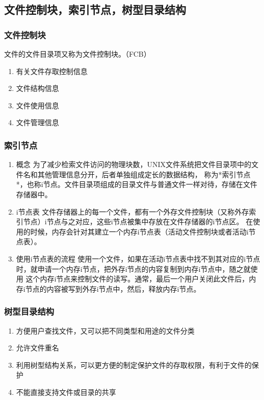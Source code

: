 \documentclass[11pt]{article}
\begin{document}
\subsection{文件控制块，索引节点，树型目录结构}
\label{sec-4-3}
\subsubsection{文件控制块}
\label{sec-4-3-1}
文件的文件目录项又称为文件控制块。（FCB）
\begin{enumerate}
\item 有关文件存取控制信息
\label{sec-4-3-1-1}
\item 文件结构信息
\label{sec-4-3-1-2}
\item 文件使用信息
\label{sec-4-3-1-3}
\item 文件管理信息
\label{sec-4-3-1-4}
\end{enumerate}
\subsubsection{索引节点}
\label{sec-4-3-2}
\begin{enumerate}
\item 概念
\label{sec-4-3-2-1}
为了减少检索文件访问的物理块数，UNIX文件系统把文件目录项中的文件名和其他管理信息分开，后者单独组成定长的数据结构， 
称为*索引节点*，也称i节点。文件目录项组成的目录文件与普通文件一样对待，存储在文件存储器中。 
\item i节点表
\label{sec-4-3-2-2}
文件存储器上的每一个文件，都有一个外存文件控制块（又称外存索引节点）i节点与之对应，这些i节点被集中存放在文件存储器的i节点区。
在使用的时候，内存会针对其建立一个内存i节点表（活动文件控制块或者活动i节点表）。
\item 使用i节点表的流程
\label{sec-4-3-2-3}
使用一个文件，如果在活动i节点表中找不到其对应的i节点时，就申请一个内存i节点，把外存i节点的内容复制到内存i节点中，随之就使用
这个内存i节点来控制文件的读写。通常，最后一个用户关闭此文件后，内存i节点的内容被写到外存i节点中，然后，释放内存i节点。
\end{enumerate}
\subsubsection{树型目录结构}
\label{sec-4-3-3}
\begin{enumerate}
\item 方便用户查找文件，又可以把不同类型和用途的文件分类
\item 允许文件重名
\item 利用树型结构关系，可以更方便的制定保护文件的存取权限，有利于文件的保护
\item 不能直接支持文件或目录的共享
\end{enumerate}
\end{document}
